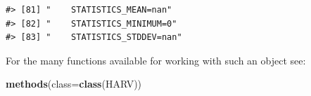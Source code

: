 \documentclass[
]{book}
\newenvironment{Shaded}{\begin{snugshade}}{\end{snugshade}}
\newcommand{\AttributeTok}[1]{\textcolor[rgb]{0.13,0.29,0.53}{#1}}
\newcommand{\FunctionTok}[1]{\textcolor[rgb]{0.13,0.29,0.53}{\textbf{#1}}}
\newcommand{\NormalTok}[1]{#1}
\begin{document}
\begin{verbatim}
#> [81] "    STATISTICS_MEAN=nan"                                                                                                                                                                                                                                                        
#> [82] "    STATISTICS_MINIMUM=0"                                                                                                                                                                                                                                                       
#> [83] "    STATISTICS_STDDEV=nan"
\end{verbatim}

For the many functions available for working with such an object see:

\begin{Shaded}
\begin{Highlighting}[]
\FunctionTok{methods}\NormalTok{(}\AttributeTok{class=}\FunctionTok{class}\NormalTok{(HARV))}
\end{Highlighting}
\end{Shaded}
\end{document}
